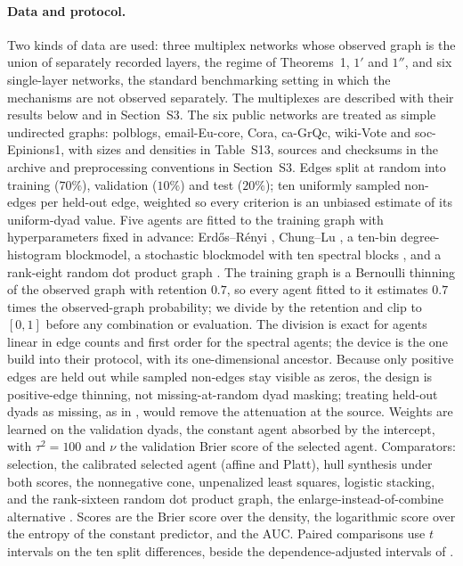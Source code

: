 \documentclass[12pt]{article}
\begin{document}
\paragraph{Data and protocol.}
Two kinds of data are used: three multiplex networks whose observed graph is the union of separately recorded layers, the regime of Theorems~1, $1'$ and $1''$, and six single-layer networks, the standard benchmarking setting in which the mechanisms are not observed separately. The multiplexes are described with their results below and in Section~S3. The six public networks are treated as simple undirected graphs: polblogs, email-Eu-core, Cora, ca-GrQc, wiki-Vote and soc-Epinions1, with sizes and densities in Table~S13, sources and checksums in the archive and preprocessing conventions in Section~S3. Edges split at random into training ($70\%$), validation ($10\%$) and test ($20\%$); ten uniformly sampled non-edges per held-out edge, weighted so every criterion is an unbiased estimate of its uniform-dyad value. Five agents are fitted to the training graph with hyperparameters fixed in advance: Erd\H{o}s--R\'enyi \citep{ErdosRenyi1960}, Chung--Lu \citep{ChungLu2002}, a ten-bin degree-histogram blockmodel, a stochastic blockmodel \citep{Holland1983} with ten spectral blocks \citep{Sussman2012, Abbe2018}, and a rank-eight random dot product graph \citep{YoungScheinerman2007, Athreya2018}. The training graph is a Bernoulli thinning of the observed graph with retention $0.7$, so every agent fitted to it estimates $0.7$ times the observed-graph probability; we divide by the retention and clip to $[0,1]$ before any combination or evaluation. The division is exact for agents linear in edge counts and first order for the spectral agents; the device is the one \citet{LiLe2024} build into their protocol, with \citet{ElkanNoto2008} its one-dimensional ancestor. Because only positive edges are held out while sampled non-edges stay visible as zeros, the design is positive-edge thinning, not missing-at-random dyad masking; treating held-out dyads as missing, as in \citet{LiLevinaZhu2020}, would remove the attenuation at the source. Weights are learned on the validation dyads, the constant agent absorbed by the intercept, with $\tau^2=100$ and $\nu$ the validation Brier score of the selected agent. Comparators: selection, the calibrated selected agent (affine and Platt), hull synthesis under both scores, the nonnegative cone, unpenalized least squares, logistic stacking, and the rank-sixteen random dot product graph, the enlarge-instead-of-combine alternative \citep{Hoff2002}. Scores are the Brier score over the density, the logarithmic score over the entropy of the constant predictor, and the AUC. Paired comparisons use $t$ intervals on the ten split differences, beside the dependence-adjusted intervals of \citet{NadeauBengio2003}.
\end{document}

